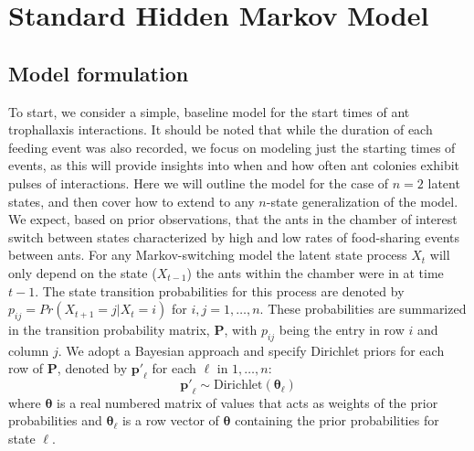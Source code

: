 \documentclass[cmbright,fleqn,referee]{envauth}
\begin{document}
\section{Standard Hidden Markov Model}
\subsection{Model formulation}
\label{s:standard}

To start, we consider a simple, baseline model for the start times of ant trophallaxis interactions. It should be noted that while the duration of each feeding event was also recorded, we focus on modeling just the starting times of events, as this will provide insights into when and how often ant colonies exhibit pulses of interactions. Here we will outline the model for the case of $n=2$ latent states, and then cover how to extend to any $n$-state generalization of the model. We expect, based on prior observations, that the ants in the chamber of interest switch between states characterized by high and low rates of food-sharing events between ants. 
For any Markov-switching model the latent state process $X_t$ will only depend on the state ($X_{t - 1}$) the ants within the chamber were in at time $t - 1$. The state transition probabilities for this process are denoted by $p_{ij} = Pr(X_{t+1} = j | X_t = i)$ for $i, j = 1, \dots, n$. These probabilities are summarized in the transition probability matrix, $\mathbf{P}$, with $p_{ij}$ being the entry in row $i$ and column $j$. We adopt a Bayesian approach and specify Dirichlet priors for each row of $\mathbf{P}$, denoted by $\mathbf{p'}_\ell$ for each $\ell$ in $1, \dots, n$:  
\begin{equation}
\mathbf{p'}_\ell \sim \text{Dirichlet}(\bm{\theta}_\ell)
\end{equation}
where $\bm{\theta}$ is a real numbered matrix of values that acts as weights of the prior probabilities and $\bm{\theta}_\ell$ is a row vector of $\bm{\theta}$ containing the prior probabilities for state $\ell$. 
\end{document}
